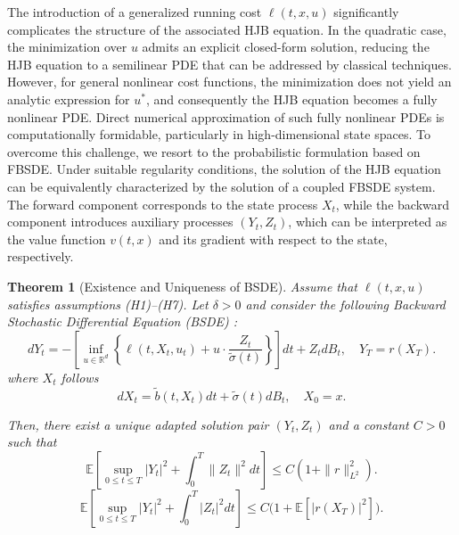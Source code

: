 \documentclass[11pt]{article}
\newtheorem{theorem}{Theorem}[section]
\def\w{\widetilde}
\begin{document}
The introduction of a generalized running cost $\ell(t,x,u)$ significantly complicates the structure of the associated HJB equation. In the quadratic case, the minimization over $u$ admits an explicit closed-form solution, reducing the HJB equation to a semilinear PDE that can be addressed by classical techniques. However, for general nonlinear cost functions, the minimization does not yield an analytic expression for $u^*$, and consequently the HJB equation becomes a fully nonlinear PDE. Direct numerical approximation of such fully nonlinear PDEs is computationally formidable, particularly in high-dimensional state spaces.  To overcome this challenge, we resort to the probabilistic formulation based on FBSDE. Under suitable regularity conditions, the solution of the HJB equation can be equivalently characterized by the solution of a coupled FBSDE system.  The forward component corresponds to the state process $X_t$, while the backward component introduces auxiliary processes $(Y_t,Z_t)$, which can be interpreted as the value function $v(t,x)$ and its gradient with respect to the state, respectively. 
\begin{theorem}[Existence and Uniqueness of BSDE]
\label{thm:fbsde_value_existence}
Assume that $\ell(t,x,u)$ satisfies assumptions (H1)–(H7). Let $\delta > 0$ and consider the following Backward Stochastic Differential Equation (BSDE) :
\begin{equation}
\label{eq:robust_BSDE}
    dY_t = -\left[\inf_{u \in \mathbb{R}^d} \left\{ \ell(t,X_t,u_t) + u \cdot \frac{Z_t}{\w\sigma(t)} \right\}  \right] dt + Z_t dB_t, \quad Y_T = r(X_T).
\end{equation}
where $X_t$ follows 
\begin{equation}
dX_t = \w b(t,X_t)dt + \w\sigma(t) dB_t,\quad X_0=x.    
\end{equation}

Then, there exist a unique adapted solution pair $(Y_t, Z_t)$ and a constant $C > 0$ such that
\begin{equation}
\mathbb{E}\left[ \sup_{0 \le t \le T} |Y_t|^2 + \int_0^T \|Z_t\|^2 dt \right] \le C \left( 1 + \|r\|_{L^2}^2 \right).
\end{equation}
\begin{equation}\label{eq:est}
\mathbb{E}\left[\sup_{0\le t\le T}|Y_t|^2 + \int_0^T |Z_t|^2 dt\right] \le C\bigl(1+\mathbb{E}[|r(X_T)|^2]\bigr).
\end{equation}

\end{theorem}
\end{document}
